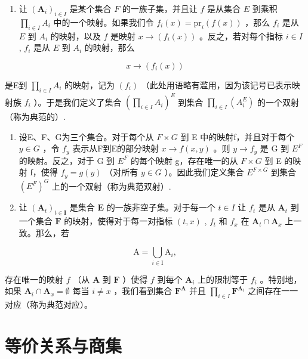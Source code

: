 \begin{enumerate}
\def\labelenumi{\arabic{enumi}.}
\setcounter{enumi}{12}
\tightlist
\item
  让 \((\mathbf{A}_i)_{i\in I}\) 是某个集合 \(F\) 的一族子集，并且让 \(f\) 是从集合 \(E\) 到乘积 \(\prod_{i\in I} A_i\) 中的一个映射。如果我们令 \(f_i(x) = \text{pr}_i(f(x))\) ，那么 \(f_i\) 是从 \(E\) 到 \(A_i\) 的映射，以及 \(f\) 是映射 \(x \to (f_i(x))\) 。反之，若对每个指标 \(i \in I\) , \(f_i\) 是从 \(E\) 到 \(A_i\) 的映射，那么
\end{enumerate}

\[
x \rightarrow (f _ {i} (x))
\]

是E到 \(\prod_{i\in I}A_i\) 的映射，记为 \((f_i)\) （此处用语略有滥用，因为该记号已表示映射族 \(f_i\) ）。于是我们定义了集合 \(\left(\prod_{i\in I}A_i\right)^E\) 到集合 \(\prod_{i\in I}(A_i^E)\) 的一个双射（称为典范的）.

\begin{enumerate}
\def\labelenumi{\arabic{enumi}.}
\setcounter{enumi}{13}
\item
  设E、F、G为三个集合。对于每个从 \(F \times G\) 到 E 中的映射f，并且对于每个 \(y \in G\) ，令 \(f_{y}\) 表示从F到E的部分映射 \(x \to f(x, y)\) 。则 \(y \to f_{y}\) 是 G 到 \(E^{F}\) 的映射。反之，对于 G 到 \(E^{F}\) 的每个映射 g，存在唯一的从 \(F \times G\) 到 E 的映射 f，使得 \(f_{y} = g(y)\) （对所有 \(y \in G\) ）。因此我们定义集合 \(E^{F \times G}\) 到集合 \((E^{F})^{G}\) 上的一个双射（称为典范双射）.
\item
  让 \((\mathbf{A}_t)_{t \in \mathbf{I}}\) 是集合 \(\mathbf{E}\) 的一族非空子集。对于每一个 \(t \in I\) 让 \(f_t\) 是从 \(\mathbf{A}_t\) 到一个集合 \(\mathbf{F}\) 的映射，使得对于每一对指标 \((t, x)\) , \(f_t\) 和 \(f_x\) 在 \(\mathbf{A}_t \cap \mathbf{A}_x\) 上一致。那么，若
\end{enumerate}

\[
\mathrm{A} = \bigcup_ {i \in \mathrm{I}} \mathrm{A} _ {i},
\]

存在唯一的映射 \(f\) （从 \(\mathbf{A}\) 到 \(\mathbf{F}\) ）使得 \(f\) 到每个 \(\mathbf{A}_i\) 上的限制等于 \(f_i\) 。特别地，如果 \(\mathbf{A}_i \cap \mathbf{A}_x = \emptyset\) 每当 \(i \neq x\) ，我们看到集合 \(\mathbf{F}^{\mathbf{A}}\) 并且 \(\prod_{i \in I} \mathbf{F}^{\mathbf{A}_i}\) 之间存在一一对应（称为典范对应）。

\section{等价关系与商集}

